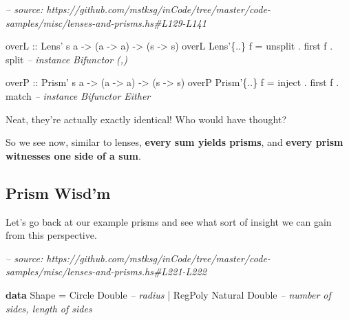 \documentclass[]{article}
\newenvironment{Shaded}{}{}
\newcommand{\CommentTok}[1]{\textcolor[rgb]{0.38,0.63,0.69}{\textit{#1}}}
\newcommand{\DataTypeTok}[1]{\textcolor[rgb]{0.56,0.13,0.00}{#1}}
\newcommand{\FunctionTok}[1]{\textcolor[rgb]{0.02,0.16,0.49}{#1}}
\newcommand{\KeywordTok}[1]{\textcolor[rgb]{0.00,0.44,0.13}{\textbf{#1}}}
\newcommand{\NormalTok}[1]{#1}
\newcommand{\OtherTok}[1]{\textcolor[rgb]{0.00,0.44,0.13}{#1}}
\begin{document}
\begin{Shaded}
\begin{Highlighting}[]
\CommentTok{-- source: https://github.com/mstksg/inCode/tree/master/code-samples/misc/lenses-and-prisms.hs#L129-L141}

\OtherTok{overL ::} \DataTypeTok{Lens'}\NormalTok{ s a }\OtherTok{->}\NormalTok{ (a }\OtherTok{->}\NormalTok{ a) }\OtherTok{->}\NormalTok{ (s }\OtherTok{->}\NormalTok{ s)}
\NormalTok{overL }\DataTypeTok{Lens'}\NormalTok{\{}\FunctionTok{..}\NormalTok{\}  f }\FunctionTok{=}\NormalTok{ unsplit }\FunctionTok{.}\NormalTok{ first f }\FunctionTok{.}\NormalTok{ split   }\CommentTok{-- instance Bifunctor (,)}

\OtherTok{overP ::} \DataTypeTok{Prism'}\NormalTok{ s a }\OtherTok{->}\NormalTok{ (a }\OtherTok{->}\NormalTok{ a) }\OtherTok{->}\NormalTok{ (s }\OtherTok{->}\NormalTok{ s)}
\NormalTok{overP }\DataTypeTok{Prism'}\NormalTok{\{}\FunctionTok{..}\NormalTok{\} f }\FunctionTok{=}\NormalTok{ inject }\FunctionTok{.}\NormalTok{ first f }\FunctionTok{.}\NormalTok{ match    }\CommentTok{-- instance Bifunctor Either}
\end{Highlighting}
\end{Shaded}

Neat, they're actually exactly identical! Who would have thought?

So we see now, similar to lenses, \textbf{every sum yields prisms}, and
\textbf{every prism witnesses one side of a sum}.

\hypertarget{prism-wisdm}{%
\subsection{Prism Wisd'm}\label{prism-wisdm}}

Let's go back at our example prisms and see what sort of insight we can gain
from this perspective.

\begin{Shaded}
\begin{Highlighting}[]
\CommentTok{-- source: https://github.com/mstksg/inCode/tree/master/code-samples/misc/lenses-and-prisms.hs#L221-L222}

\KeywordTok{data} \DataTypeTok{Shape} \FunctionTok{=} \DataTypeTok{Circle}  \DataTypeTok{Double}           \CommentTok{-- radius}
           \FunctionTok{|} \DataTypeTok{RegPoly} \DataTypeTok{Natural} \DataTypeTok{Double}   \CommentTok{-- number of sides, length of sides}
\end{Highlighting}
\end{Shaded}
\end{document}
